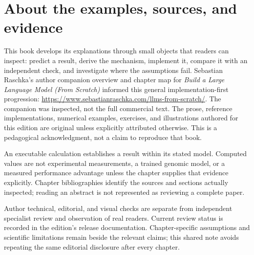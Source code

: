 \chapter*{About the examples, sources, and evidence}

This book develops its explanations through small objects that readers can
inspect: predict a result, derive the mechanism, implement it, compare it with
an independent check, and investigate where the assumptions fail.
Sebastian Raschka's author companion overview and chapter map for
\emph{Build a Large Language Model (From Scratch)} informed this general
implementation-first progression:
\url{https://www.sebastianraschka.com/llms-from-scratch/}.
The companion was inspected, not the full commercial text.
The prose, reference implementations, numerical examples, exercises, and
illustrations authored for this edition are original unless explicitly
attributed otherwise. This is a pedagogical acknowledgment, not a claim
to reproduce that book.

An executable calculation establishes a result within its stated model.
Computed values are not experimental measurements, a trained genomic
model, or a measured performance advantage unless the chapter supplies
that evidence explicitly. Chapter bibliographies identify the sources
and sections actually inspected; reading an abstract is not represented
as reviewing a complete paper.

Author technical, editorial, and visual checks are separate from independent
specialist review and observation of real readers. Current review status
is recorded in the edition's release documentation. Chapter-specific
assumptions and scientific limitations remain beside the relevant claims;
this shared note avoids repeating the same editorial disclosure after
every chapter.
